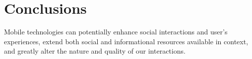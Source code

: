 \documentclass{sig-alternate}
\begin{document}
\section{Conclusions}
    \label{sc:Conclusion}
Mobile technologies can potentially enhance social interactions and user's experiences, extend both social and informational resources available in context, and greatly alter the nature and quality of our interactions.
%
%
%
%

%

\end{document}
